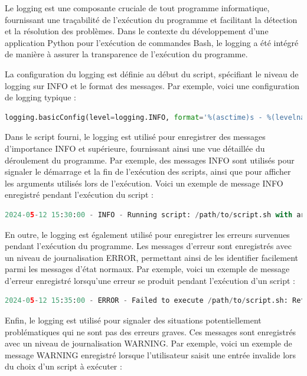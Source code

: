 Le logging est une composante cruciale de tout programme informatique, fournissant une traçabilité de l'exécution du programme et facilitant la détection et la résolution des problèmes. Dans le contexte du développement d'une application Python pour l'exécution de commandes Bash, le logging a été intégré de manière à assurer la transparence de l'exécution du programme.\newline

La configuration du logging est définie au début du script, spécifiant le niveau de logging sur INFO et le format des messages. Par exemple, voici une configuration de logging typique :

\begin{lstlisting}[language=Python, breaklines=true]
logging.basicConfig(level=logging.INFO, format='%(asctime)s - %(levelname)s - %(message)s')
\end{lstlisting}

Dans le script fourni, le logging est utilisé pour enregistrer des messages d'importance INFO et supérieure, fournissant ainsi une vue détaillée du déroulement du programme. Par exemple, des messages INFO sont utilisés pour signaler le démarrage et la fin de l'exécution des scripts, ainsi que pour afficher les arguments utilisés lors de l'exécution. Voici un exemple de message INFO enregistré pendant l'exécution du script :

\begin{lstlisting}[language=Python, breaklines=true]
2024-05-12 15:30:00 - INFO - Running script: /path/to/script.sh with arguments: [arg1, arg2, arg3]
\end{lstlisting}

En outre, le logging est également utilisé pour enregistrer les erreurs survenues pendant l'exécution du programme. Les messages d'erreur sont enregistrés avec un niveau de journalisation ERROR, permettant ainsi de les identifier facilement parmi les messages d'état normaux. Par exemple, voici un exemple de message d'erreur enregistré lorsqu'une erreur se produit pendant l'exécution d'un script :

\begin{lstlisting}[language=Python, breaklines=true]
2024-05-12 15:35:00 - ERROR - Failed to execute /path/to/script.sh: Return code 1
\end{lstlisting}

Enfin, le logging est utilisé pour signaler des situations potentiellement problématiques qui ne sont pas des erreurs graves. Ces messages sont enregistrés avec un niveau de journalisation WARNING. Par exemple, voici un exemple de message WARNING enregistré lorsque l'utilisateur saisit une entrée invalide lors du choix d'un script à exécuter :

